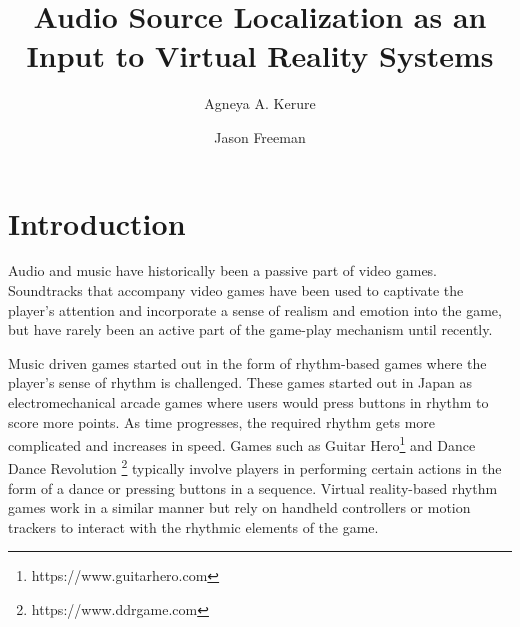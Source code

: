 \documentclass[convention]{aesconf}
\title{Audio Source Localization as an Input to Virtual Reality Systems}
\author[1]{Agneya A. Kerure}
\author[1]{Jason Freeman}
\affil[1]{Georgia Institute of Technology}
\begin{document}

\section{Introduction}
Audio and music have historically been a passive part of video games. Soundtracks that accompany video games have been used to captivate the player's attention and incorporate a sense of realism and emotion into the game, but have rarely been an active part of the game-play mechanism until recently.

Music driven games started out in the form of rhythm-based games where the player's sense of rhythm is challenged. These games started out in Japan as electromechanical arcade games where users would press buttons in rhythm to score more points. As time progresses, the required rhythm gets more complicated and increases in speed. Games such as Guitar Hero\footnote{https://www.guitarhero.com} and Dance Dance Revolution \footnote{https://www.ddrgame.com} typically involve players in performing certain actions in the form of a dance or pressing buttons in a sequence. Virtual reality-based rhythm games work in a similar manner but rely on handheld controllers or motion trackers to interact with the rhythmic elements of the game.
\end{document}
